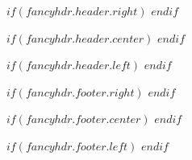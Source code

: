 \fancyhf{} %
$if(fancyhdr.header.right)$
$endif$

$if(fancyhdr.header.center)$
$endif$

$if(fancyhdr.header.left)$
$endif$

$if(fancyhdr.footer.right)$
$endif$

$if(fancyhdr.footer.center)$
$endif$

$if(fancyhdr.footer.left)$
$endif$




